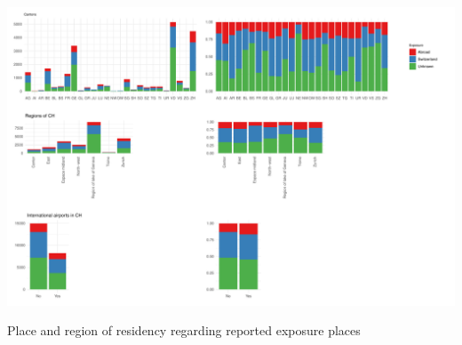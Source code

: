 \documentclass[10pt, a4paper, twoside]{article}
\begin{document}
\clearpage
\begin{suppfigure}[h]
\centering
\includegraphics[scale=0.4]{SF3_2021-05-26.pdf}
\caption{Place and region of residency regarding reported exposure places}
\label{sf3}
\end{suppfigure}
\end{document}
